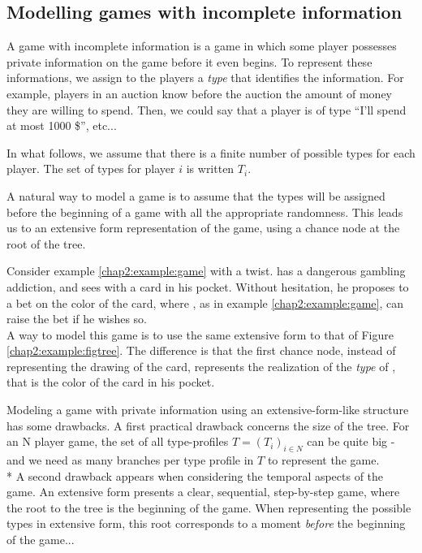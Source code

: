\subsection{Modelling games with incomplete information}
\label{ch2:bayesianGames}

A game with incomplete information is a game in which some player possesses private information on the game before it even begins. To represent these  informations, we assign to the players a \emph{type} that identifies the information. For example, players in an auction know before the auction the amount of money they are willing to spend. Then, we could say that a player is of type ``I'll spend at most 1000 \$'', etc...

 In what follows, we assume that there is a finite number of possible types for each player. The set of types for player $i$ is written $T_i$.

A natural way to model a game is to assume that the types will be assigned before the beginning of a game with all the appropriate randomness. This leads us to an extensive form representation of the game, using a chance node at the root of the tree.
\begin{example}
Consider example \ref{chap2:example:game} with a twist. \TAone{} has a dangerous gambling addiction, and sees \TAtwo{} with a card in his pocket.  Without hesitation, he proposes to \TAtwo{} a bet on the color of the card, where \TAtwo{}, as in example \ref{chap2:example:game}, can raise the bet if he wishes so.\\
A way to model this game is to use the same extensive form to that of Figure \ref{chap2:example:figtree}. The difference is that the first chance node, instead of representing the drawing of the card, represents the realization of the \emph{type} of \TAtwo{}, that is the color of the card in his pocket.
\label{ch2:exbayintro}
\end{example}

Modeling a game with private information using an extensive-form-like structure has some drawbacks.
A first practical drawback concerns the size of the tree. For an N player game, the set of all type-profiles $T = (T_i)_{i \in N}$ can be quite big - and we need as many branches per type profile in $T$ to represent the game. \\*
A second drawback appears when considering the temporal aspects of the game.
An extensive form presents a clear, sequential, step-by-step game, where the root to the tree is the beginning of the game. When representing the possible types in extensive form, this root corresponds to a moment \emph{before} the beginning of the game...


